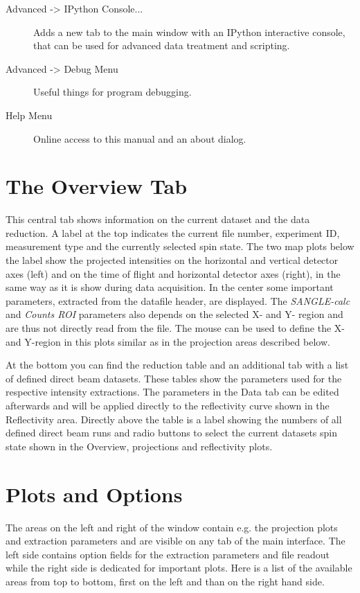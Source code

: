 \begin{description}
   \item[{ Advanced -> IPython Console...}] Adds a new tab to the main window with an IPython interactive console, that can be used for advanced data treatment and scripting.
   \item[Advanced -> Debug Menu] Useful things for program debugging.
    
   \item[Help Menu] Online access to this manual and an about dialog.
   
   \end{description}

\section{The Overview Tab}
  This central tab shows information on the current dataset and the data reduction. A label at the top indicates the current file number, experiment ID, measurement type and the currently selected spin state.
  The two map plots below the label show the projected intensities on the horizontal and vertical detector axes (left) and on the time of flight and horizontal detector axes (right), in the same way as it is show during data acquisition.
  In the center some important parameters, extracted from the datafile header, are displayed. The \textit{SANGLE-calc} and \textit{Counts ROI} parameters also depends on the selected X- and Y- region and are thus not directly read from the file.
  The mouse can be used to define the X- and Y-region in this plots similar as in the projection areas described below.
  
  At the bottom you can find the reduction table and an additional tab with a list of defined direct beam datasets.
  These tables show the parameters used for the respective intensity extractions.
  The parameters in the Data tab can be edited afterwards and will be applied directly to the reflectivity curve shown in the Reflectivity area.
  Directly above the table is a label showing the numbers of all defined direct beam runs and radio buttons to select the current datasets spin state shown in the Overview, projections and reflectivity plots.
  
\section{Plots and Options}
  The areas on the left and right of the window contain e.g. the projection plots and extraction parameters and are visible on any tab of the main interface. The left side contains option fields for the extraction parameters and file readout while the right side is dedicated for important plots.
  Here is a list of the available areas from top to bottom, first on the left and than on the right hand side.
  
